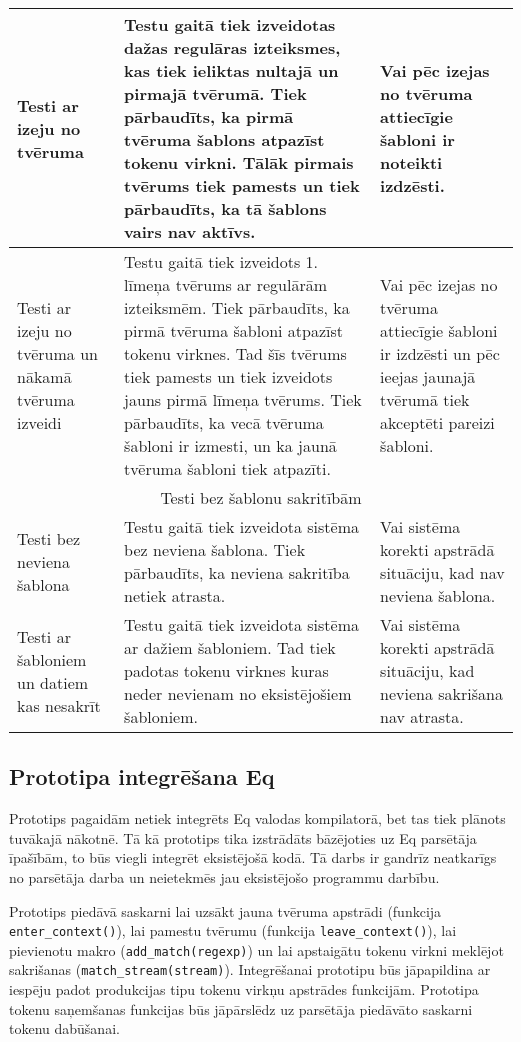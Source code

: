 \begin{longtable}{|p{90pt}|p{210pt}|p{120pt}|}
Testi ar izeju no tvēruma & Testu gaitā tiek izveidotas dažas regulāras izteiksmes, kas tiek ieliktas nultajā un pirmajā tvērumā. Tiek pārbaudīts, ka pirmā tvēruma šablons atpazīst tokenu virkni. Tālāk pirmais tvērums tiek pamests un tiek pārbaudīts, ka tā šablons vairs nav aktīvs. & Vai pēc izejas no tvēruma attiecīgie šabloni ir noteikti izdzēsti. \\ \hline
Testi ar izeju no tvēruma un nākamā tvēruma izveidi & Testu gaitā tiek izveidots 1. līmeņa tvērums ar regulārām izteiksmēm. Tiek pārbaudīts, ka pirmā tvēruma šabloni atpazīst tokenu virknes. Tad šīs tvērums tiek pamests un tiek izveidots jauns pirmā līmeņa tvērums. Tiek pārbaudīts, ka vecā tvēruma šabloni ir izmesti, un ka jaunā tvēruma šabloni tiek atpazīti. & Vai pēc izejas no tvēruma attiecīgie šabloni ir izdzēsti un pēc ieejas jaunajā tvērumā tiek akceptēti pareizi šabloni. \\ \hline
\multicolumn{ 3}{|c|}{Testi bez šablonu sakritībām} \\ \hline
Testi bez neviena šablona & Testu gaitā tiek izveidota sistēma bez neviena šablona. Tiek pārbaudīts, ka neviena sakritība netiek atrasta. & Vai sistēma korekti apstrādā situāciju, kad nav neviena šablona. \\ \hline
Testi ar šabloniem un datiem kas nesakrīt & Testu gaitā tiek izveidota sistēma ar dažiem šabloniem. Tad tiek padotas tokenu virknes kuras neder nevienam no eksistējošiem šabloniem. & Vai sistēma korekti apstrādā situāciju, kad neviena sakrišana nav atrasta. \\ \hline
\end{longtable}

\subsection{\label{sbs:res_tintegration}Prototipa integrēšana Eq}

Prototips pagaidām netiek integrēts Eq valodas kompilatorā, bet tas tiek plānots tuvākajā nākotnē. Tā kā prototips tika izstrādāts bāzējoties uz Eq parsētāja īpašībām, to būs viegli integrēt eksistējošā kodā. Tā darbs ir gandrīz neatkarīgs no parsētāja darba un neietekmēs jau eksistējošo programmu darbību.

Prototips piedāvā saskarni lai uzsākt jauna tvēruma apstrādi (funkcija \verb|enter_context()|), lai pamestu tvērumu (funkcija \verb|leave_context()|), lai pievienotu makro (\verb|add_match(regexp)|) un lai apstaigātu tokenu virkni meklējot sakrišanas (\verb|match_stream(stream)|). Integrēšanai prototipu būs jāpapildina ar iespēju padot produkcijas tipu tokenu virkņu apstrādes funkcijām. Prototipa tokenu saņemšanas funkcijas būs jāpārslēdz uz parsētāja piedāvāto saskarni tokenu dabūšanai.

